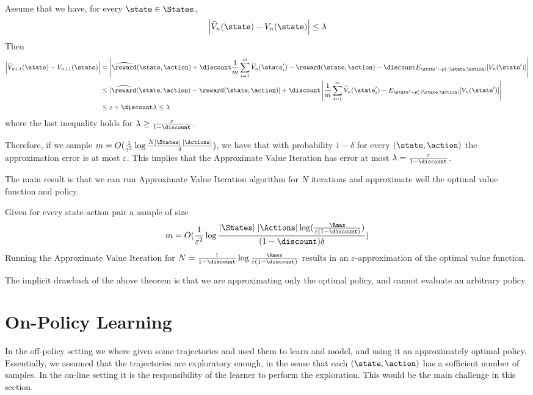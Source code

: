 Assume that we have, for every $\state \in \States$,
\[
\left|\widehat{V}_n(\state) - V_n(\state)\right|\leq \lambda
\]
Then
\begin{align*}
\left|\widehat{V}_{n+1}(\state)-V_{n+1}(\state)\right|& =
\left|\widehat{\reward}(\state,\action)+\discount
\frac{1}{m}\sum_{i=1}^m \widehat{V}_n(\state'_i) -
\reward(\state,\action)-\discount E_{\state'\sim p(\cdot
|\state,\action)} [V_n(\state')] \right|\\
&\leq |\widehat{\reward}(\state,\action)- \reward(\state,\action)|
+\discount \left| \frac{1}{m}\sum_{i=1}^m \widehat{V}_n(\state'_i) -
E_{\state'\sim p(\cdot
|\state,\action)} [V_n(\state')] \right|\\
%
 &\leq \varepsilon+\discount\lambda\leq \lambda
\end{align*}
where the last inequality holds for $\lambda\geq
\frac{\varepsilon}{1-\discount}$.

Therefore, if we sample $m=O(\frac{1}{\varepsilon^2}\log \frac{N
|\States| \;|\Actions|}{\delta})$, we have that with probability
$1-\delta$ for every $(\state,\action)$ the approximation error is
at most $\varepsilon$. This implies that the Approximate Value
Iteration has error at most
$\lambda=\frac{\varepsilon}{1-\discount}$.


The main result is that we can run Approximate Value Iteration
algorithm for $N$ iterations and approximate well the optimal value
function and policy.

\begin{theorem}
Given for every state-action pair a sample of size
\[
m=O(\frac{1}{\varepsilon^2}\log \frac{ |\States| \;|\Actions|\log (
\frac{\Rmax}{\varepsilon(1-\discount)} ) }{(1-\discount)\delta})
\]
Running the Approximate Value Iteration for
$N=\frac{1}{1-\discount}\log \frac{\Rmax}{\varepsilon(1-\discount)}$
results in an $\varepsilon$-approximation of the optimal value
function.
\end{theorem}

The implicit drawback of the above theorem is that we are
approximating only the optimal policy, and cannot evaluate an
arbitrary policy.

\section{On-Policy Learning}

In the off-policy setting we where given some trajectories and used
them to learn and model, and using it an approximately optimal
policy. Essentially, we assumed that the trajectories are
exploratory enough, in the sense that each $(\state,\action)$ has a
sufficient number of samples.
%
In the on-line setting it is the responsibility of the learner to
perform the exploration. This would be the main challenge in this
section.

